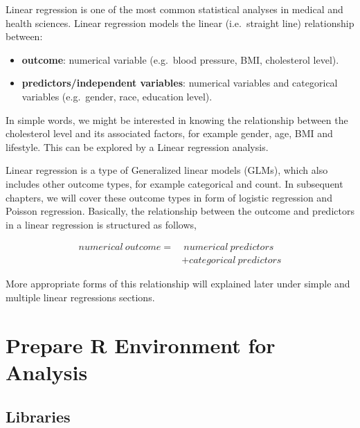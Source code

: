 \documentclass[
  10pt,
]{krantz}
\providecommand{\tightlist}{%
  \setlength{\itemsep}{0pt}\setlength{\parskip}{0pt}}
\begin{document}
Linear regression is one of the most common statistical analyses in medical and health sciences. Linear regression models the linear (i.e.~straight line) relationship between:

\begin{itemize}
\tightlist
\item
  \textbf{outcome}: numerical variable (e.g.~blood pressure, BMI, cholesterol level).
\item
  \textbf{predictors/independent variables}: numerical variables and categorical variables (e.g.~gender, race, education level).
\end{itemize}

In simple words, we might be interested in knowing the relationship between the cholesterol level and its associated factors, for example gender, age, BMI and lifestyle. This can be explored by a Linear regression analysis.

Linear regression is a type of Generalized linear models (GLMs), which also includes other outcome types, for example categorical and count. In subsequent chapters, we will cover these outcome types in form of logistic regression and Poisson regression. Basically, the relationship between the outcome and predictors in a linear regression is structured as follows,

\[\begin{aligned}
numerical\ outcome = &\ numerical\ predictors \\
& + categorical\ predictors
\end{aligned}\]

More appropriate forms of this relationship will explained later under simple and multiple linear regressions sections.

\hypertarget{prepare-r-environment-for-analysis}{%
\section{Prepare R Environment for Analysis}\label{prepare-r-environment-for-analysis}}

\hypertarget{libraries}{%
\subsection{Libraries}\label{libraries}}
\end{document}
